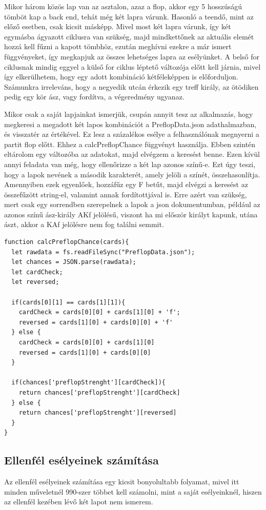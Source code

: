 Mikor három közös lap van az asztalon, azaz a flop, akkor egy 5 hosszúságú tömböt kap a back end, tehát még két lapra várunk.  Hasonló a teendő, mint az előző esetben, csak kicsit másképp. Mivel most két lapra várunk, így két egymásba ágyazott ciklusra van szükség, majd mindkettőnek az aktuális elemét hozzá kell fűzni a kapott tömbhöz, ezután meghívni ezekre a már ismert függvényeket, így megkapjuk az összes lehetséges lapra az esélyünket. A belső for ciklusnak mindig eggyel a külső for ciklus léptető változója előtt kell járnia, mivel így elkerülhetem, hogy egy adott kombináció kétféleképpen is előforduljon. Számunkra irreleváns, hogy a negyedik utcán érkezik egy treff király, az ötödiken pedig egy kör ász, vagy fordítva, a végeredmény ugyanaz.

Mikor csak a saját lapjainkat ismerjük, csupán annyit tesz az alkalmazás, hogy megkeresi a megadott két lapos kombinációt a PreflopData.json adathalmazban, és visszatér az értékével. Ez lesz a százalékos esélye a felhasználónak megnyerni a partit flop előtt. Ehhez a calcPreflopChance függvényt használja. Ebben szintén eltárolom egy változóba az adatokat, majd elvégzem a keresést benne. Ezen kívül annyi feladata van még, hogy ellenőrizze a két lap azonos színű-e. Ezt úgy teszi, hogy a lapok nevének a második karakterét, amely jelöli a színét, összehasonlítja. Amennyiben ezek egyenlőek, hozzáfűz egy F betűt, majd elvégzi a keresést az összefűzött string-el, valamint annak fordítottjával is. Erre azért van szükség, mert csak egy sorrendben szerepelnek a lapok a json dokumentumban, például az azonos színű ász-király AKf jelölésű, viszont ha mi először királyt kapunk, utána ászt, akkor a KAf jelölésre nem fog találni semmit.

\begin{lstlisting}[style=htmlcssjs]
function calcPreflopChance(cards){
  let rawdata = fs.readFileSync("PreflopData.json");
  let chances = JSON.parse(rawdata);
  let cardCheck;
  let reversed;

  if(cards[0][1] == cards[1][1]){
    cardCheck = cards[0][0] + cards[1][0] + 'f';
    reversed = cards[1][0] + cards[0][0] + 'f'
  } else {
    cardCheck = cards[0][0] + cards[1][0]
    reversed = cards[1][0] + cards[0][0] 
  }

  if(chances['preflopStrenght'][cardCheck]){
    return chances['preflopStrenght'][cardCheck]
  } else {
    return chances['preflopStrenght'][reversed]
  }
}
\end{lstlisting}

\subsection{Ellenfél esélyeinek számítása}
Az ellenfél esélyeinek számítása egy kicsit bonyolultabb folyamat, mivel itt minden műveletnél 990-szer többet kell számolni, mint a saját esélyeinknél, hiszen az ellenfél kezében lévő két lapot nem ismerem.

